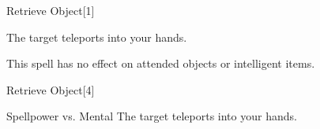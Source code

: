 \begin{spellsection}{Retrieve Object}[1]
    \begin{spellheader}
    \end{spellheader}
    \begin{spellcontent}
        \begin{spelltargetinginfo}
        \end{spelltargetinginfo}
        \begin{spelleffects}
            \spelleffect The target teleports into your hands.
        \end{spelleffects}
    \end{spellcontent}
    \begin{spellfooter}
        \spellnotes This spell has no effect on attended objects or intelligent items.
        \miscastrandom
    \end{spellfooter}
\end{spellsection}

\begin{spellsection}[Greater]{Retrieve Object}[4]
    \begin{spellheader}
    \end{spellheader}
    \begin{spellcontent}
        \begin{spelltargetinginfo}
        \end{spelltargetinginfo}
        \begin{spelleffects}
            \begin{spellattack}{Spellpower vs. Mental}
                \spellsuccess The target teleports into your hands.
            \end{spellattack}
        \end{spelleffects}
    \end{spellcontent}
    \begin{spellfooter}
        \miscastrandom
    \end{spellfooter}
\end{spellsection}

